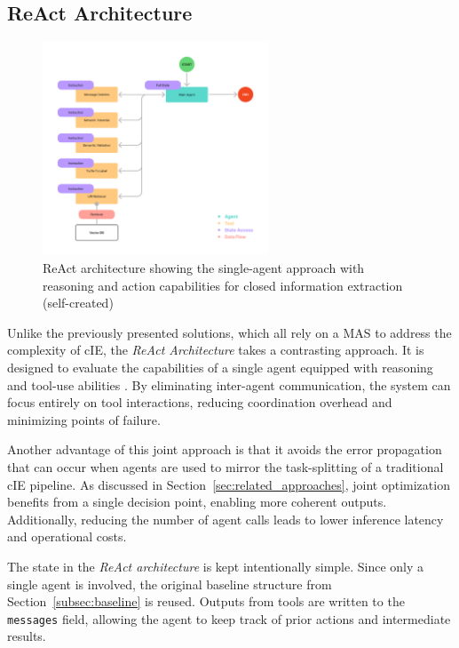 \documentclass[a4paper,oneside,bibliography=totoc]{scrbook}
\begin{document}
\subsection{ReAct Architecture}
\label{subsec:react}

\begin{figure}[tp]
  \centering
  \includegraphics[width=0.6\textwidth]{figures/ReAct Architecture.png}
  \caption[ReAct architecture showing the single-agent approach with reasoning and action capabilities for closed information extraction]{ReAct architecture showing the single-agent approach with reasoning and action capabilities for closed information extraction (self-created)}
  \label{fig:react_architecture}
\end{figure}

Unlike the previously presented solutions, which all rely on a \ac{MAS} to address the complexity of \ac{cIE}, the \textit{ReAct Architecture} takes a contrasting approach. It is designed to evaluate the capabilities of a single agent equipped with reasoning and tool-use abilities \cite{Yao2023}. By eliminating inter-agent communication, the system can focus entirely on tool interactions, reducing coordination overhead and minimizing points of failure.

Another advantage of this joint approach is that it avoids the error propagation that can occur when agents are used to mirror the task-splitting of a traditional \ac{cIE} pipeline. As discussed in Section~\ref{sec:related_approaches}, joint optimization benefits from a single decision point, enabling more coherent outputs. Additionally, reducing the number of agent calls leads to lower inference latency and operational costs.

The state in the \textit{ReAct architecture} is kept intentionally simple. Since only a single agent is involved, the original baseline structure from Section~\ref{subsec:baseline} is reused. Outputs from tools are written to the \texttt{messages} field, allowing the agent to keep track of prior actions and intermediate results.
\end{document}
